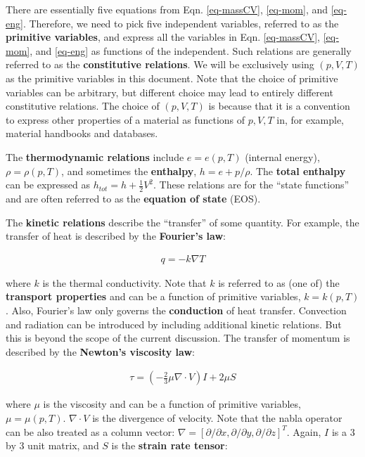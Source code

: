 \documentclass[12pt, letterpaper]{report}
\begin{document}
There are essentially five equations from Eqn. \ref{eq-massCV}, \ref{eq-mom}, and \ref{eq-eng}.
Therefore, we need to pick five independent variables, referred to as the {\bf primitive variables},
and express all the variables in Eqn.  \ref{eq-massCV}, \ref{eq-mom}, and \ref{eq-eng} as functions
of the independent. Such relations are generally referred to as the {\bf constitutive relations}. We
will be exclusively using $(p, V, T)$ as the primitive variables in this document. Note that the
choice of primitive variables can be arbitrary, but different choice may lead to entirely different
constitutive relations. The choice of $(p, V, T)$ is because that it is a convention to express
other properties of a material as functions of $p, V, T$ in, for example, material handbooks and
databases.
\paraspace

The {\bf thermodynamic relations} include $e = e(p, T)$ (internal energy), $\rho = \rho(p, T)$, and
sometimes the {\bf enthalpy}, $h = e + p/\rho$. The {\bf total enthalpy} can be expressed as
$h_{tot} = h + \tfrac{1}{2}V^2$. These relations are for the ``state functions'' and are often
referred to as the {\bf equation of state} (EOS).
\paraspace

The {\bf kinetic relations} describe the ``transfer'' of some quantity. For example, the transfer of
heat is described by the {\bf Fourier's law}:

\begin{align*}
   q = -k\nabla T
\end{align*}

where $k$ is the thermal conductivity. Note that $k$ is referred to as (one of) the {\bf transport
properties} and can be a function of primitive variables, $k = k(p,T)$. Also, Fourier's law only
governs the {\bf conduction} of heat transfer. Convection and radiation can be introduced by
including additional kinetic relations. But this is beyond the scope of the current discussion. The
transfer of momentum is described by the {\bf Newton's viscosity law}:

\begin{align*}
   \tau = \left(-\frac{2}{3}\mu \nabla \cdot V\right) I + 2 \mu S
\end{align*}

where $\mu$ is the viscosity and can be a function of primitive variables, $\mu = \mu(p, T)$.
$\nabla \cdot V$ is the divergence of velocity. Note that the nabla operator can be also treated as
a column vector: $\nabla = [\partial/\partial x, \partial/\partial y, \partial/\partial z]^T$.
Again, $I$ is a 3 by 3 unit matrix, and $S$ is the {\bf strain rate tensor}:
\end{document}
